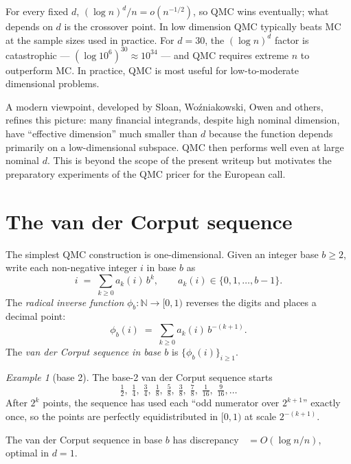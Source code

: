 \documentclass[11pt,a4paper]{article}
\theoremstyle{plain}
\theoremstyle{definition}
\theoremstyle{remark}
\newtheorem{example}[theorem]{Example}
\newcommand{\N}{\mathbb{N}}
\DeclareMathOperator{\Disc}{D^*}
\begin{document}
For every fixed $d$, $(\log n)^d / n = o(n^{-1/2})$, so QMC wins
eventually; what depends on $d$ is the crossover point. In low
dimension QMC typically beats MC at the sample sizes used in
practice. For $d = 30$, the $(\log n)^d$ factor is
catastrophic --- $(\log 10^6)^{30} \approx 10^{34}$ --- and QMC
requires extreme $n$ to outperform MC. In practice, QMC is most
useful for low-to-moderate dimensional problems.

A modern viewpoint, developed by Sloan, Wo\'zniakowski, Owen and
others, refines this picture: many financial integrands, despite
high nominal dimension, have ``effective dimension'' much smaller
than $d$ because the function depends primarily on a low-dimensional
subspace. QMC then performs well even at large nominal $d$. This is
beyond the scope of the present writeup but motivates the
preparatory experiments of the QMC pricer for the European call.

\section{The van der Corput sequence}
\label{sec:vdc}

The simplest QMC construction is one-dimensional. Given an integer
base $b \geq 2$, write each non-negative integer $i$ in base $b$ as
\begin{equation}
i \;=\; \sum_{k \geq 0} a_k(i) \, b^k,
\qquad a_k(i) \in \{0, 1, \ldots, b-1\}.
\end{equation}
The \emph{radical inverse function} $\phi_b : \N \to [0, 1)$ reverses
the digits and places a decimal point:
\begin{equation}
\phi_b(i) \;=\; \sum_{k \geq 0} a_k(i) \, b^{-(k+1)}.
\end{equation}
The \emph{van der Corput sequence in base $b$} is $\{\phi_b(i)\}_{i
\geq 1}$.

\begin{example}[base 2]
The base-2 van der Corput sequence starts
\[
\tfrac{1}{2}, \;\tfrac{1}{4}, \;\tfrac{3}{4}, \;\tfrac{1}{8},
\;\tfrac{5}{8}, \;\tfrac{3}{8}, \;\tfrac{7}{8}, \;\tfrac{1}{16},
\;\tfrac{9}{16}, \ldots
\]
After $2^k$ points, the sequence has used each ``odd numerator over
$2^{k+1}$'' exactly once, so the points are perfectly equidistributed
in $[0, 1)$ at scale $2^{-(k+1)}$.
\end{example}

The van der Corput sequence in base $b$ has discrepancy
$\Disc = O(\log n / n)$, optimal in $d = 1$.
\end{document}
